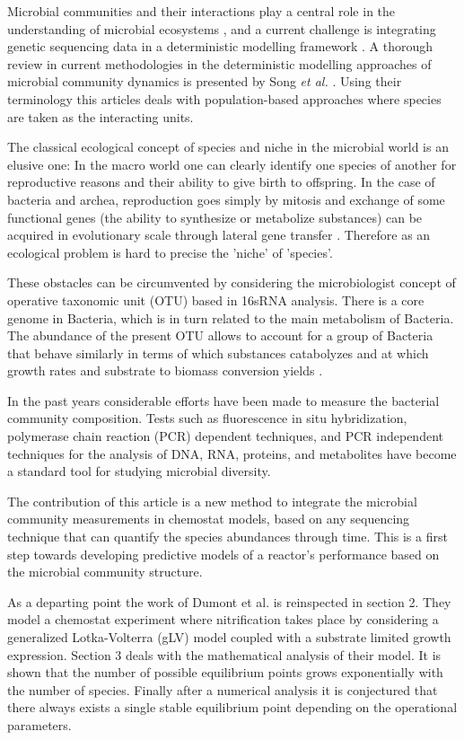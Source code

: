 \documentclass[3p,times]{elsarticle}
\begin{document}
Microbial communities and their interactions play a central role in the understanding of microbial ecosystems \cite{West2007}, and a current challenge is integrating genetic sequencing data in a deterministic modelling framework \cite{Widder2016,WADE201664}. A thorough review in current methodologies in the deterministic modelling approaches of microbial community dynamics is presented by Song \textit{et al.} \cite{Song2014}. Using their terminology this articles deals with population-based approaches where species are taken as the interacting units.

The classical ecological concept of species and niche in the microbial world is an elusive one: In the macro world one can clearly identify one species of another for reproductive reasons and their ability to give birth to offspring. In the case of bacteria and archea, reproduction goes simply by mitosis and exchange of some functional genes (the ability to synthesize or metabolize substances) can be acquired in evolutionary scale through lateral gene transfer \cite{Boucher2003}. Therefore as an ecological problem is hard to precise the 'niche' of 'species'.

These obstacles can be circumvented by considering the microbiologist concept of operative taxonomic unit (OTU) based in 16sRNA analysis. There is a core genome in Bacteria, which is in turn related to the main metabolism of Bacteria. The abundance of the present OTU allows to account for a group of Bacteria that behave similarly in terms of which substances catabolyzes and at which growth rates and substrate to biomass conversion yields \cite{Muyzer1993}.

In the past years considerable efforts have been made to measure the bacterial community composition. Tests such as fluorescence in situ hybridization, polymerase chain reaction (PCR) dependent techniques, and PCR independent techniques for the analysis of DNA, RNA, proteins, and metabolites have become a standard tool for studying  microbial diversity\cite{FERRERA2016790}. 

The contribution of this article is a new method to integrate the microbial community measurements in chemostat models, based on any sequencing technique that can quantify the species abundances through time. This is a first step towards developing predictive models of a reactor's performance based on the microbial community structure.

As a departing point the work of Dumont et al.\cite{Dumont2016} is reinspected in section 2. They model a chemostat experiment where nitrification takes place by considering a generalized Lotka-Volterra (gLV) model \cite{Hernandez-Bermejo1997} coupled with a substrate limited growth expression. Section 3 deals with the mathematical analysis of their model. It is shown that the number of possible equilibrium points grows exponentially with the number of species. Finally after a numerical analysis it is conjectured that there always exists a single stable equilibrium point depending on the operational parameters.  
\end{document}

